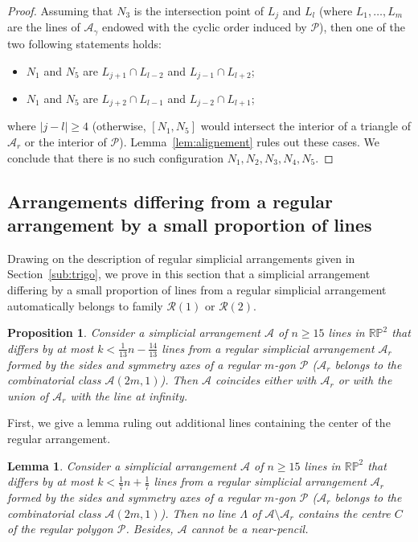\documentclass[a4paper,11pt,reqno]{amsart}
\newtheorem{prop}[thm]{Proposition}
\newtheorem{lem}[thm]{Lemma}
\theoremstyle{definition}
\theoremstyle{remark}
\theoremstyle{definition}
\theoremstyle{definition}
\theoremstyle{definition}
\numberwithin{equation}{section}
\begin{document}
\begin{proof}
\par
Assuming that $N_{3}$ is the intersection point of $L_{j}$ and $L_{l}$ (where $L_{1},\dots,L_{m}$ are the lines of $\mathcal{A}_{\gamma}$ endowed with the cyclic order induced by $\mathcal{P}$), then one of the two following statements holds:
\begin{itemize}
    \item $N_{1}$ and $N_{5}$ are $L_{j+1} \cap L_{l-2}$ and $L_{j-1} \cap L_{l+2}$;
    \item $N_{1}$ and $N_{5}$ are $L_{j+2} \cap L_{l-1}$ and $L_{j-2} \cap L_{l+1}$;
\end{itemize}
where $|j-l| \geq 4$ (otherwise, $[N_{1},N_{5}]$ would intersect the interior of a triangle of $\mathcal{A}_{r}$ or the interior of $\mathcal{P}$). Lemma~\ref{lem:alignement} rules out these cases. We conclude that there is no such configuration $N_{1},N_{2},N_{3},N_{4},N_{5}$.
\end{proof}

\subsection{Arrangements differing from a regular arrangement by a small proportion of lines}\label{sub:difference}

Drawing on the description of regular simplicial arrangements given in Section~\ref{sub:trigo}, we prove in this section that a simplicial arrangement differing by a small proportion of lines from a regular simplicial arrangement automatically belongs to family $\mathcal{R}(1)$ or $\mathcal{R}(2)$.

\begin{prop}\label{prop:rigidity}
Consider a simplicial arrangement $\mathcal{A}$ of $n \geq 15$ lines in $\mathbb{RP}^{2}$ that differs by at most $k < \frac{1}{13}n - \frac{14}{13}$ lines from a regular simplicial arrangement $\mathcal{A}_{r}$ formed by the sides and symmetry axes of a regular $m$-gon $\mathcal{P}$ ($\mathcal{A}_{r}$ belongs to the combinatorial class $\mathcal{A}(2m,1)$). Then $\mathcal{A}$ coincides either with $\mathcal{A}_{r}$ or with the union of $\mathcal{A}_{r}$ with the line at infinity.
\end{prop}

First, we give a lemma ruling out additional lines containing the center of the regular arrangement.

\begin{lem}\label{lem:rigidity}
Consider a simplicial arrangement $\mathcal{A}$ of $n \geq 15$ lines in $\mathbb{RP}^{2}$ that differs by at most $k < \frac{1}{7}n + \frac{1}{7}$ lines from a regular simplicial arrangement $\mathcal{A}_{r}$ formed by the sides and symmetry axes of a regular $m$-gon $\mathcal{P}$ ($\mathcal{A}_{r}$ belongs to the combinatorial class $\mathcal{A}(2m,1)$). Then no line $\Lambda$ of $\mathcal{A} \setminus \mathcal{A}_{r}$ contains the centre $C$ of the regular polygon $\mathcal{P}$. Besides, $\mathcal{A}$ cannot be a near-pencil.
\end{lem}
\end{document}
